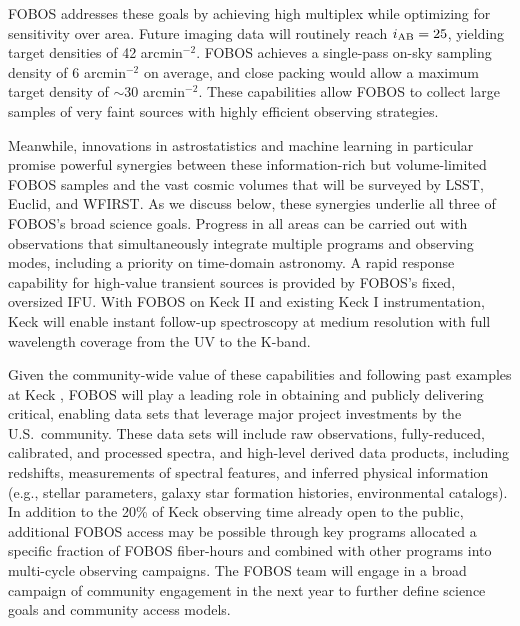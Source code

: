 FOBOS addresses these goals by achieving high multiplex while optimizing for sensitivity over area.  Future imaging
data will routinely reach $i_{\rm AB} = 25$, yielding target densities of 42 arcmin$^{-2}$.  FOBOS achieves a
single-pass on-sky sampling density of 6 arcmin$^{-2}$ on average, and close packing would allow a maximum target density of
$\sim$30 arcmin$^{-2}$.  These capabilities allow FOBOS to collect large samples of very faint sources with highly
efficient observing strategies.

Meanwhile, innovations in astrostatistics and machine learning in particular promise powerful synergies between these
information-rich but volume-limited FOBOS samples and the vast cosmic volumes that will be surveyed by LSST, Euclid,
and WFIRST.  As we discuss below, these synergies underlie all three of FOBOS's broad science goals.  Progress in all areas can be carried out with observations that simultaneously integrate multiple programs and observing modes, including a priority on time-domain astronomy.  A rapid response capability for high-value transient sources is provided by FOBOS's fixed, oversized IFU.  With FOBOS on Keck II and existing Keck I instrumentation, Keck will enable instant follow-up spectroscopy at medium resolution with full wavelength coverage from the UV to the K-band.  

Given the community-wide value of these capabilities  and
following past examples at Keck \citep[e.g., DEEP2][]{newman13}, FOBOS will play a leading role in obtaining and
publicly delivering critical, enabling data sets that leverage major project investments by the U.S.~community.  These
data sets will include raw observations, fully-reduced, calibrated, and processed spectra, and high-level derived data
products, including redshifts, measurements of spectral features, and inferred physical information (e.g., stellar
parameters, galaxy star formation histories, environmental catalogs).  In addition to the 20\% of Keck observing time
already open to the public, additional FOBOS access may be possible through key programs allocated a specific fraction
of FOBOS fiber-hours and combined with other programs into multi-cycle observing campaigns.  The FOBOS team will engage in a broad campaign of community engagement in the next year to further define science goals and community access models.


